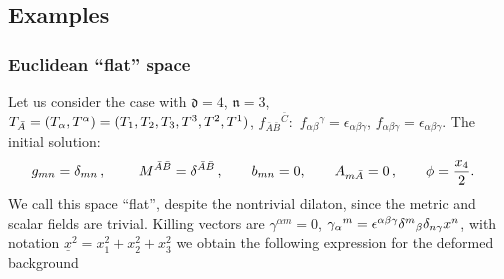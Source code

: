 \documentclass[12pt, utf8]{article}
\numberwithin{equation}{section}
\begin{document}
\subsection{Examples}\label{gaugedsugraex}

\subsubsection{Euclidean ``flat'' space}

Let us consider the case with $\mathfrak{d} = 4$, $\mathfrak{n} = 3$,  ${T}_{\bar{A}} = ({T}_\alpha,{T}^\alpha) = (T_1 , T_2, T_3, T^3, T^2, T^1)$, $f_{\bar{A}\bar{B}}{}^{\bar{C}}:$ $f_{\alpha \beta}{}^{\gamma} = \epsilon_{\alpha \beta \gamma}$, $f_{\alpha \beta \gamma} = \epsilon_{\alpha \beta \gamma}$. The initial solution: 
\begin{equation}
    \begin{aligned}
  &  g_{m n} = \delta_{mn} \, , \qquad\ M^{\bar{A}\bar{B}} = \delta^{\bar{A}\bar{B}} \, ,  \qquad b_{mn} = 0, \qquad A_{m \bar{A}} = 0 \, ,  \qquad \phi = \frac{x_4}{2}.
    \end{aligned}
\end{equation}
We call this space ``flat'', despite the nontrivial dilaton, since the metric and scalar fields are trivial. Killing vectors are $\gamma^{\alpha m} = 0$, $\gamma_{\alpha}{}^{m} = \epsilon^{\alpha \beta \gamma} \delta^{m}{}_{\beta} \delta_{n \gamma} x^{n}$, with notation $ \underline{x}^2 = x_1^2+x_2^2+x_3^2$ we obtain the following expression for the deformed background
\end{document}
